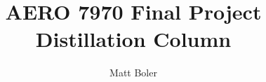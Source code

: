 \documentclass[]{article}
\title{AERO 7970 Final Project \\ Distillation Column}
\author{Matt Boler}
\begin{document}
\maketitle



\section{}
\end{document}
